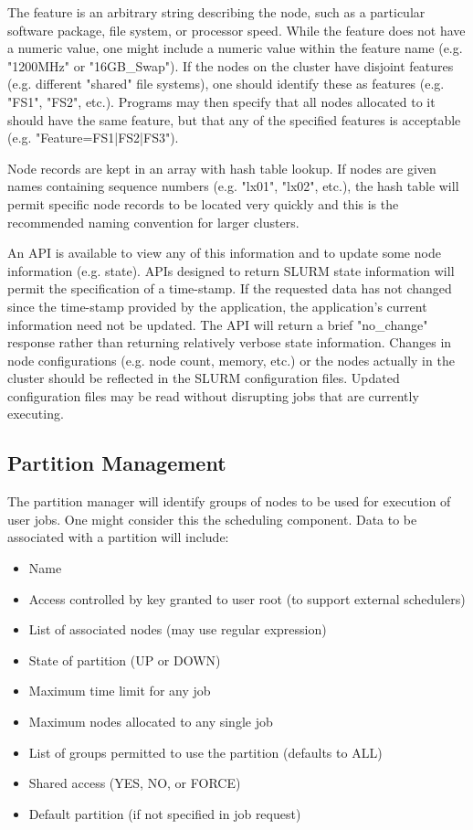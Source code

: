 The feature is an arbitrary string describing the node, such as
a particular software package, file system, or processor speed.
While the feature does not have a numeric value, one might include a
numeric value within the feature name (e.g. "1200MHz" or "16GB\_Swap").
If the nodes on the cluster have disjoint features (e.g. different
"shared" file systems), one should identify these as features (e.g. "FS1",
"FS2", etc.).  Programs may then specify that all nodes allocated to it
should have the same feature, but that any of the specified features is
acceptable (e.g. "Feature=FS1|FS2|FS3").

Node records are kept in an array with hash table lookup. 
If nodes are given names containing sequence numbers (e.g. "lx01", "lx02", 
etc.), the hash table will permit specific node records to be located 
very quickly and this is the recommended naming convention for larger 
clusters.

An API is available to view any of this information and to update some 
node information (e.g. state). APIs designed to return SLURM
state information will permit the specification of a time-stamp.  If the
requested data has not changed since the time-stamp provided by the
application, the application's current information need not be updated.
The API will return a brief "no\_change" response rather than returning
relatively verbose state information.
Changes in node configurations (e.g. node count, memory, etc.) or the nodes 
actually in the cluster should be reflected in the SLURM configuration 
files. Updated configuration files may be read without disrupting jobs 
that are currently executing.

\subsection{Partition Management}

The partition manager will identify groups of nodes to be used for
execution of user jobs. One might consider this the scheduling component. 
Data to be associated with a partition will include:
\begin{itemize}
\item Name
\item Access controlled by key granted to user root (to support external schedulers)
\item List of associated nodes (may use regular expression)
\item State of partition (UP or DOWN)
\item Maximum time limit for any job
\item Maximum nodes allocated to any single job
\item List of groups permitted to use the partition (defaults to ALL)
\item Shared access (YES, NO, or FORCE)
\item Default partition (if not specified in job request)
\end{itemize}


